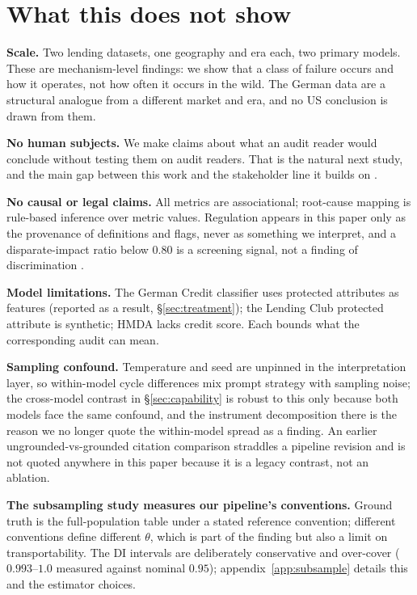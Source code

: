\documentclass[sigconf,nonacm]{acmart}
\begin{document}
\section{What this does not show}
\label{sec:limitations}

\textbf{Scale.} Two lending datasets, one geography and era each, two
primary models. These are mechanism-level findings: we show that a class of
failure occurs and how it operates, not how often it occurs in the wild. The
German data are a structural analogue from a different market and era, and no
US conclusion is drawn from them.

\textbf{No human subjects.} We make claims about what an audit reader would
conclude without testing them on audit readers. That is the natural next
study, and the main gap between this work and the stakeholder line it builds
on \citep{luo2025,luo2026b}.

\textbf{No causal or legal claims.} All metrics are associational; root-cause
mapping is rule-based inference over metric values. Regulation appears in this
paper only as the provenance of definitions and flags, never as something
we interpret, and a disparate-impact ratio below $0.80$ is a screening
signal, not a finding of discrimination \citep{barocas2016,wachter2021}.

\textbf{Model limitations.} The German Credit classifier uses protected
attributes as features (reported as a result, \S\ref{sec:treatment}); the
Lending Club protected attribute is synthetic; HMDA lacks credit score. Each
bounds what the corresponding audit can mean.

\textbf{Sampling confound.} Temperature and seed are unpinned in the
interpretation layer, so within-model cycle differences mix prompt strategy
with sampling noise; the cross-model contrast in \S\ref{sec:capability} is
robust to this only because both models face the same confound, and the
instrument decomposition there is the reason we no longer quote the
within-model spread as a finding. An earlier ungrounded-vs-grounded citation
comparison straddles a pipeline revision and is not quoted anywhere in this
paper because it is a legacy contrast, not an ablation.

\textbf{The subsampling study measures our pipeline's conventions.} Ground
truth is the full-population table under a stated reference convention;
different conventions define different $\theta$, which is part of the finding
but also a limit on transportability. The DI intervals are deliberately
conservative and over-cover ($0.993$--$1.0$ measured against nominal $0.95$);
appendix~\ref{app:subsample} details this and the estimator choices.
\end{document}
